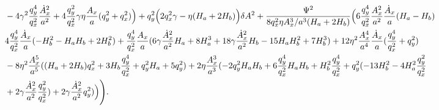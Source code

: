 \documentclass[%
 reprint,
 amsmath,amssymb,
 aps,
]{revtex4-1}
\begin{document}
\begin{widetext}
\begin{equation}
\begin{split}
&-4\gamma^2\frac{q_y^4}{q_x^2}\frac{\dot{A}_x^2}{a^2}+4\frac{q_y^2}{q_x^2}\gamma\eta\frac{A_x}{a}(q_y^2+q_x^2) \Bigr)+q_y^2\Bigl(2q_x^2\gamma-\eta (H_a+2H_b)\Bigr)\delta A^2+\frac{\Psi^2}{8q_x^2\eta A_x^3/a^3(H_a+2H_b)}\Bigl( 6\frac{q_y^4}{q_x^2}\frac{A_x^2}{a^2}\frac{\dot{A}_x}{a}(H_a-H_b)\\
&4\frac{q_y^4}{q_x^2}\frac{\dot{A}_x}{a}(-H_b^2-H_aH_b+2H_b^2)+\frac{q_y^4}{q_x^2}\frac{A_x}{a}(6\gamma\frac{\dot{A}_x^2}{a^2}H_a+8H_a^3+18\gamma \frac{\dot{A}_x^2}{a^2}H_b-15H_aH_b^2+7H_b^3)+12\eta^2\frac{A_x^4}{a^4}\frac{\dot{A}_x}{a}(\frac{q_y^4}{q_x^2}+q_y^2)\\
&-8\eta^2\frac{A_x^5}{a^5}((H_a+2H_b)q_x^2+3H_b\frac{q_y^4}{q_x^2}+q_y^2H_a+5q_y^2)+2\eta\frac{A_x^3}{a^3}(-2q_y^2H_aH_b+6\frac{q_y^4}{q_x^2}H_aH_b +H_b^2\frac{q_y^4}{q_x^2}+q_y^2(-13H_b^2-4H_a^2\frac{q_y^2}{q_x^2}\\
&+2\gamma\frac{\dot{A}_x^2}{a^2}\frac{q_y^2}{q_x^2})+2\gamma\frac{\dot{A}_x^2}{a^2}q_y^2)\Bigr) \Biggr).
\end{split}
\end{equation}
\end{widetext}


\end{document}
